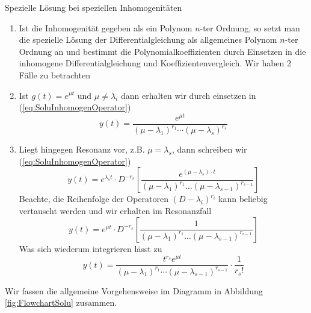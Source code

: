 \begin{note}{Spezielle Lösung bei speziellen Inhomogenitäten}
  \begin{enumerate}
    \item Ist die Inhomogenität gegeben als ein Polynom $n$-ter Ordnung, so setzt
      man die spezielle Lösung der Differentialgleichung als allgemeines
      Polynom $n$-ter Ordnung an und bestimmt die Polynomialkoeffizienten durch
      Einsetzen in die inhomogene Differentialgleichung und
      Koeffizientenvergleich.  Wir haben 2 Fälle zu betrachten
    \item Ist $g(t)=e^{\mu t}$ und $\mu\ne\lambda_i$ dann erhalten wir durch
      einsetzen in (\ref{eq:SoluInhomogenOperator}) 
  \[ y(t)=\frac{e^{\mu t}}{(\mu-\lambda_1)^{r_1}
            \cdots(\mu-\lambda_s)^{r_s}}\]
	  \item Liegt hingegen Resonanz vor, z.B.  $\mu=\lambda_s$, dann schreiben wir (\ref{eq:SoluInhomogenOperator})
	    \[y(t)=e^{\lambda_s t}\cdot D^{-r_s}
	    \left[\frac{e^{(\mu-\lambda_s)\cdot t}}{(\mu-\lambda_1)^{r_1}\dots(\mu-\lambda_{s-1})^{r_{s-1}}}\right]\]
	    Beachte, die Reihenfolge der Operatoren $(D-\lambda_i)^{r_i}$
	    kann beliebig vertauscht werden und wir erhalten im Resonanzfall
	    \[y(t)=e^{\mu t}\cdot D^{-r_s}
	      \left[\frac{1}{(\mu-\lambda_1)^{r_1}\dots(\mu-\lambda_{s-1})^{r_{s-1}}}\right]\]
	    Was sich wiederum integrieren lässt zu
	\[ y(t)=\frac{t^{r_s}e^{\mu t}}{(\mu-\lambda_1)^{r_1} \cdots(\mu-\lambda_{s-1})^{r_{s-1}}}
	\cdot\frac{1}{r_s!}\]
  \end{enumerate}
\end{note}
Wir fassen die allgemeine Vorgehensweise im Diagramm in Abbildung
\ref{fig:FlowchartSolu} zusammen.
%
